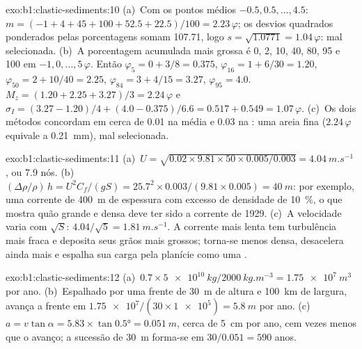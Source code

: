 \begin{solution}{exo:b1:clastic-sediments:10}
(a)~Com os pontos médios $-0.5, 0.5, \ldots, 4.5$: $m = (-1 + 4 + 45 + 100 + 52.5
+ 22.5)/100 = 2.23\,\varphi$; os desvios quadrados ponderados pelas porcentagens somam \num{107.71}, logo $s = \sqrt{1.0771} = 1.04\,\varphi$: mal selecionada. (b)~A porcentagem acumulada mais grossa é 0, 2, 10, 40, 80, 95 e
100 em $-1, 0, \ldots, 5\,\varphi$. Então $\varphi_5 = 0 + 3/8 = 0.375$,
$\varphi_{16} = 1 + 6/30 = 1.20$, $\varphi_{50} = 2 + 10/40 = 2.25$,
$\varphi_{84} = 3 + 4/15 = 3.27$, $\varphi_{95} = 4.0$. $M_z = (1.20 + 2.25 +
3.27)/3 = 2.24\,\varphi$ e $\sigma_I = (3.27 - 1.20)/4 + (4.0 - 0.375)/6.6 =
0.517 + 0.549 = 1.07\,\varphi$. (c)~Os dois métodos concordam em cerca de
\num{0.01} na média e \num{0.03} na : uma areia fina ($2.24\,\varphi$ equivale a \qty{0.21}{mm}), mal selecionada.
\end{solution}

\begin{solution}{exo:b1:clastic-sediments:11}
(a)~$U = \sqrt{0.02 \times 9.81 \times 50 \times 0.005/0.003} =
\qty{4.04}{m.s^{-1}}$, ou 7.9 nós. (b)~$(\Delta\rho/\rho)\,h = U^2
C_f/(gS) = 25.7^2 \times 0.003/(9.81 \times 0.005) = \qty{40}{m}$: por exemplo,
uma corrente de \qty{400}{m} de espessura com excesso de densidade de \qty{10}{\percent}, o que mostra quão grande e densa deve ter sido a corrente de 1929. (c)~A velocidade varia com $\sqrt S$: $4.04/\sqrt 5 = \qty{1.81}{m.s^{-1}}$. A corrente mais lenta tem turbulência mais fraca e deposita seus grãos mais grossos; torna-se menos densa, desacelera ainda mais e espalha sua carga pela planície como uma .
\end{solution}

\begin{solution}{exo:b1:clastic-sediments:12}
(a)~$0.7 \times \qty{5e10}{kg}/\qty{2000}{kg.m^{-3}} = \qty{1.75e7}{m^3}$ por ano. (b)~Espalhado por uma frente de \qty{30}{m} de altura e \qty{100}{km} de largura, avança a frente em $\num{1.75e7}/(30 \times \num{1e5}) = \qty{5.8}{m}$ por ano. (c)~$a = v\tan\alpha = 5.83 \times \tan\ang{0.5} = \qty{0.051}{m}$, cerca de \qty{5}{cm} por ano, cem vezes menos que o avanço; a sucessão de \qty{30}{m} forma-se em $30/0.051 = 590$ anos.
\end{solution}

